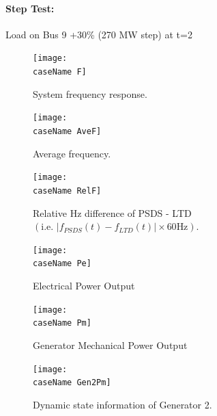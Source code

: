 \documentclass[12pt]{article}
\begin{document}
\pagebreak
\newcommand{\caseName}{kundurStep}
\paragraph{Step Test:} Load on Bus 9 +30\% (270 MW step) at t=2
	\begin{figure}[h!]
			\centering
			\texttt{[image: \\caseName F]}\vspace{-.5em}
			\caption{System frequency response.}
			\label{\caseName F}		 
	\end{figure}%
	\begin{figure}[h!]
			\centering
			\texttt{[image: \\caseName AveF]}\vspace{-.5em}
			\caption{Average frequency.}
			\label{\caseName AveF}		 
	\end{figure}%

	\begin{figure}[h!]
			\centering
			\texttt{[image: \\caseName RelF]}\vspace{-.5em}
			\caption{Relative Hz difference of PSDS - LTD $\left( \text{i.e. }  \left|f_{PSDS}(t)- f_{LTD}(t)\right| \times 60 \text{Hz} \right)$.}
			\label{\caseName RelF}		 
	\end{figure}%
%
\pagebreak
	\begin{figure}[h!]
			\centering
			\texttt{[image: \\caseName Pe]}\vspace{-.5em}
			\caption{Electrical Power Output}
			\label{\caseName Pe}		 
	\end{figure}%
	\begin{figure}[h!]
			\centering
			\texttt{[image: \\caseName Pm]}\vspace{-.5em}
			\caption{Generator Mechanical Power Output}
			\label{\caseName Pm}		 
	\end{figure}%
	\begin{figure}[h!]
			\centering
			\texttt{[image: \\caseName Gen2Pm]}\vspace{-.5em}
			\caption{Dynamic state information of Generator 2.}
			\label{\caseName V}		 
	\end{figure}%
\end{document}
